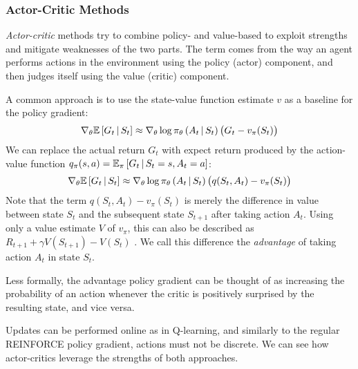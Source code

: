 \subsubsection{Actor-Critic Methods}
\textit{Actor-critic} methods \cite{bible} try to combine policy- and value-based to exploit strengths and mitigate weaknesses of the two parts. The term comes from the way an agent performs actions in the environment using the policy (actor) component, and then judges itself using the value (critic) component.

A common approach is to use the state-value function estimate $v$ as a baseline for the policy gradient:
\begin{equation*}
    \nabla_\theta \mathbb{E}\left[G_t \,\middle|\, S_t \right] \approx \nabla_\theta \log \pi_\theta\left(A_t \,\middle|\, S_t\right) \left(G_t - v_\pi(S_t)\right)
\end{equation*}
We can replace the actual return $G_t$ with expect return produced by the action-value function $q_\pi(s, a) = \mathbb{E}_\pi \left[G_t \,\middle|\, S_t = s, A_t = a\right]$:
\begin{equation*}
    \nabla_\theta \mathbb{E}\left[G_t \,\middle|\, S_t \right] \approx \nabla_\theta \log \pi_\theta\left(A_t \,\middle|\, S_t\right) \left(q(S_t, A_t) - v_\pi(S_t)\right)
\end{equation*}
Note that the term $q(S_t, A_t) - v_\pi(S_t)$ is merely the difference in value between state $S_t$ and the subsequent state $S_{t+1}$ after taking action $A_t$. Using only a value estimate $V$ of $v_\pi$, this can also be described as $R_{t+1} + \gamma V(S_{t+1}) - V(S_t)$ \cite{a3c}. We call this difference the \textit{advantage} of taking action $A_t$ in state $S_t$.

Less formally, the advantage policy gradient can be thought of as increasing the probability of an action whenever the critic is positively surprised by the resulting state, and vice versa.

Updates can be performed online as in Q-learning, and similarly to the regular REINFORCE policy gradient, actions must not be discrete. We can see how actor-critics leverage the strengths of both approaches.